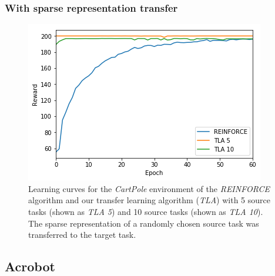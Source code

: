 \subsubsection{With sparse representation transfer} %
\label{ssub:cartpole:with_sparse_representation_transfer}
\begin{figure}[H]
    \centering
    \includegraphics[width=.8\linewidth]{images/results/CartPole/sparse_transfer/reward_target_re-akt5-akt10.png}
    \caption[Learning curves for the \textit{CartPole} environment of \textit{REINFORCE} and \textit{TLA} using sparse representation transfer]{Learning curves for the \emph{CartPole} environment of the \textit{REINFORCE} algorithm and our transfer learning algorithm (\textit{TLA}) with 5 source tasks (shown as \textit{TLA 5}) and 10 source tasks (shown as \textit{TLA 10}). The sparse representation of a randomly chosen source task was transferred to the target task.}
    \label{fig:CartPole:st:reward_target_re-akt5-akt10}
\end{figure}

\subsection{Acrobot} %
\label{sub:acrobot}
